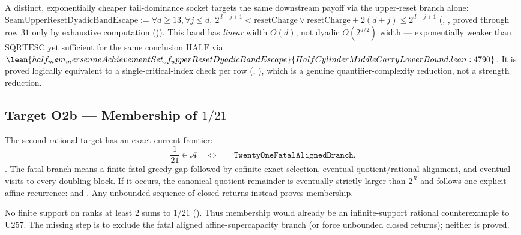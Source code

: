 A distinct, exponentially cheaper tail-dominance socket targets the same downstream payoff via
the upper-reset branch alone: $\mathrm{SeamUpperResetDyadicBandEscape} := \forall d\ge13,\forall
j\le d,\ 2^{d-j+1}<\mathrm{resetCharge}\vee\mathrm{resetCharge}+2(d+j)\le2^{d-j+1}$
(, ,
proved  through row $31$ only by exhaustive computation
()).
This band has \emph{linear} width $O(d)$, not dyadic $O(2^{d/2})$ width --- exponentially weaker
than $\mathrm{SQRTESC}$ yet sufficient for the same conclusion $\mathrm{HALF}$ via
$\lean{half_mem_mersenneAchievementSet_of_upperResetDyadicBandEscape}{HalfCylinderMiddleCarryLowerBound.lean:4790}$.
It is proved logically equivalent to a single-critical-index check per row
(, ), which is a genuine
quantifier-complexity reduction, not a strength reduction.

\subsection{Target O2b --- Membership of $1/21$}

The second rational target has an exact current frontier:
\[
 \frac1{21}\in\mathcal A
 \quad\Longleftrightarrow\quad
 \neg\,\mathtt{TwentyOneFatalAlignedBranch}.
\]
\quad{}.  The fatal branch means a finite fatal greedy gap followed
by cofinite exact selection, eventual quotient/rational alignment, and
eventual visits to every doubling block.  If it occurs, the canonical
quotient remainder is eventually strictly larger than $2^R$ and follows one
explicit affine recurrence:
and
.
Any unbounded sequence of closed returns instead proves membership.

No finite support on ranks at least $2$ sums to $1/21$
().
Thus membership would already be an infinite-support rational counterexample
to $\mathrm{U257}$.  The missing step is to exclude the fatal aligned
affine-supercapacity branch (or force unbounded closed returns); neither is
proved. 

